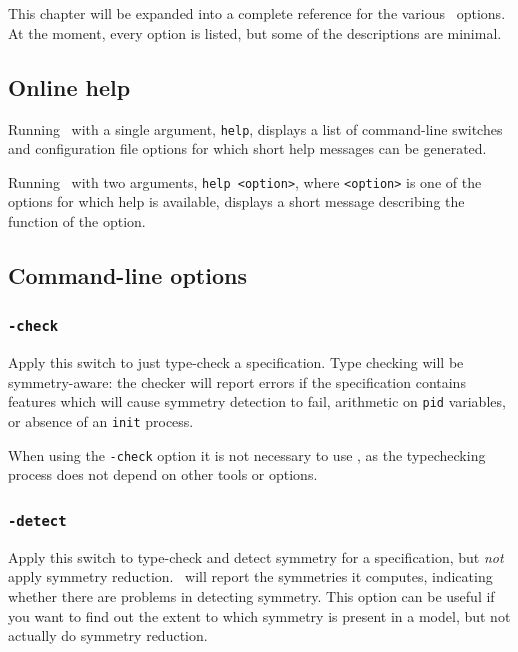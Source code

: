 \chapter{\overviewofoptions}\label{chapter:overview}

This chapter will be expanded into a complete reference for the
various \topspin\ options.  At the moment, every option is listed, but some of the descriptions are minimal.

\section{Online help}

Running \topspin\ with a single argument, \texttt{help}, displays a list of command-line switches and configuration file options for which
short help messages can be generated.

Running \topspin\ with two arguments, \texttt{help <option>}, where \texttt{<option>} is one of the options for which help is available, displays
a short message describing the function of the option.

\section{Command-line options}\label{sec:overview:commandline}

\subsection{\texttt{-check}}

Apply this switch to just type-check a specification.  Type checking will be symmetry-aware: the checker will report errors if the specification
contains features which will cause symmetry detection to fail, \eg arithmetic on \texttt{pid} variables, or absence of an \texttt{init} process.

When using the \texttt{-check} option it is not necessary to use , as the typechecking process does not depend on other tools
or options.

\subsection{\texttt{-detect}}

Apply this switch to type-check and detect symmetry for a specification, but \emph{not} apply symmetry reduction.  \topspin\ will report the
symmetries it computes, indicating whether there are problems in detecting symmetry.  This option can be useful if you want to find out the extent to
which symmetry is present in a model, but not actually do symmetry reduction.


